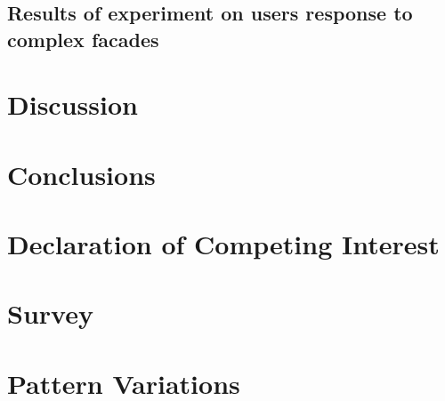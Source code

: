 \documentclass[final,5p,times]{elsarticle}%
\begin{document}
\begin{linenumbers}
    \subsection{Results of experiment on users response to complex facades}
    \label{subsec:ResultsExperiment}
    

\section{Discussion}
\label{sec:Discussion}



\section{Conclusions}
\label{sec:Conclusion}


\section{Declaration of Competing Interest}
\label{sec:DeclarationInterest}


%

\end{linenumbers}




\newpage
\clearpage
\appendix

\section{Survey}
\label{sec:Annexsurvey}


\section{Pattern Variations}
\label{sec:AnnexVariations}

\end{document}
